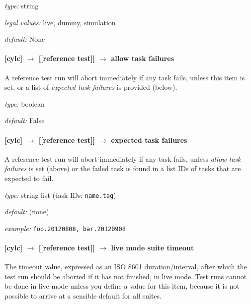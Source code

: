 \begin{myitemize}
    \item {\em type:} string
    \item {\em legal values:} live, dummy, simulation
    \item {\em default:} None
\end{myitemize}

\paragraph[allow task failures]{[cylc] $\rightarrow$ [[reference test]] $\rightarrow$ allow task failures}

A reference test run will abort immediately if any task fails, unless
this item is set, or a list of {\em expected task failures} is provided
(below).

\begin{myitemize}
    \item {\em type:} boolean
    \item {\em default:} False
\end{myitemize}

\paragraph[expected task failures]{[cylc] $\rightarrow$ [[reference test]] $\rightarrow$ expected task failures}

A reference test run will abort immediately if any task fails, unless
{\em allow task failures} is set (above) or the failed task is found
in a list IDs of tasks that are expected to fail.

\begin{myitemize}
    \item {\em type:} string list (task IDs: \lstinline=name.tag=)
    \item {\em default:} (none)
    \item {\em example:} \lstinline=foo.20120808, bar.20120908=
\end{myitemize}

\paragraph[live mode suite timeout]{[cylc] $\rightarrow$ [[reference test]] $\rightarrow$ live mode suite timeout}

The timeout value, expressed as an ISO 8601 duration/interval, after which the
test run should be aborted if it has not finished, in live mode. Test runs
cannot be done in live mode unless you define a value for this item, because
it is not possible to arrive at a sensible default for all suites.

